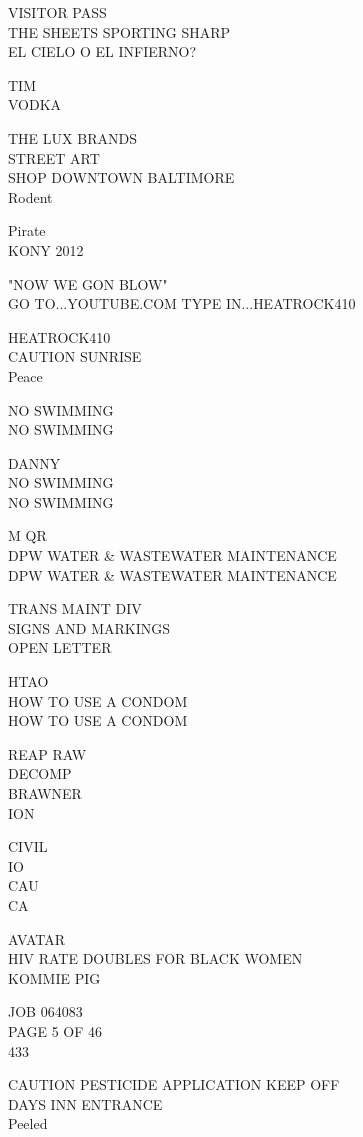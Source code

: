 \documentclass[10pt,letterpaper]{article}
\begin{document}
VISITOR PASS\\
THE SHEETS SPORTING SHARP\\
EL CIELO O EL INFIERNO?

TIM\\
VODKA

THE LUX BRANDS\\
STREET ART\\
SHOP DOWNTOWN BALTIMORE\\
Rodent

Pirate\\
KONY 2012

"NOW WE GON BLOW"\\
GO TO...YOUTUBE.COM TYPE IN...HEATROCK410

HEATROCK410\\
CAUTION SUNRISE\\
Peace

NO SWIMMING\\
NO SWIMMING

DANNY\\
NO SWIMMING\\
NO SWIMMING

M QR\\
DPW WATER \& WASTEWATER MAINTENANCE\\
DPW WATER \& WASTEWATER MAINTENANCE

TRANS MAINT DIV\\
SIGNS AND MARKINGS\\
OPEN LETTER

HTAO\\
HOW TO USE A CONDOM\\
HOW TO USE A CONDOM

REAP RAW\\
DECOMP\\
BRAWNER\\
ION

CIVIL\\
IO\\
CAU\\
CA

AVATAR\\
HIV RATE DOUBLES FOR BLACK WOMEN\\
KOMMIE PIG

JOB 064083\\
PAGE 5 OF 46\\
433

CAUTION PESTICIDE APPLICATION KEEP OFF\\
DAYS INN ENTRANCE\\
Peeled
\end{document}
